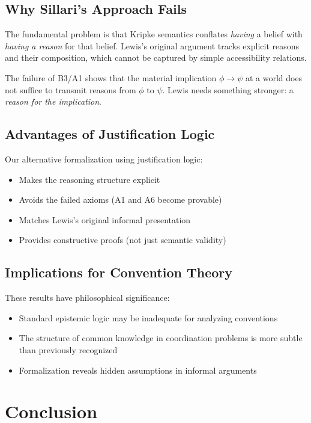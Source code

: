 \documentclass[11pt]{article}
\begin{document}
\subsection{Why Sillari's Approach Fails}

The fundamental problem is that Kripke semantics conflates \emph{having} a belief 
with \emph{having a reason} for that belief. Lewis's original argument tracks 
explicit reasons and their composition, which cannot be captured by simple 
accessibility relations.

The failure of B3/A1 shows that the material implication $\phi \to \psi$ at a 
world does not suffice to transmit reasons from $\phi$ to $\psi$. Lewis needs 
something stronger: a \emph{reason for the implication}.

\subsection{Advantages of Justification Logic}

Our alternative formalization using justification logic:
\begin{itemize}
\item Makes the reasoning structure explicit
\item Avoids the failed axioms (A1 and A6 become provable)
\item Matches Lewis's original informal presentation
\item Provides constructive proofs (not just semantic validity)
\end{itemize}

\subsection{Implications for Convention Theory}

These results have philosophical significance:
\begin{itemize}
\item Standard epistemic logic may be inadequate for analyzing conventions
\item The structure of common knowledge in coordination problems is more subtle 
than previously recognized
\item Formalization reveals hidden assumptions in informal arguments
\end{itemize}

\section{Conclusion}
\end{document}

